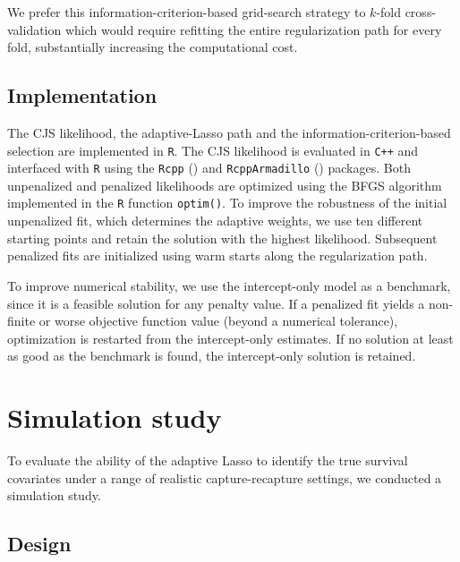 \documentclass[
  11pt,
  a4paper,
]{article}
\begin{document}
We prefer this information-criterion-based grid-search strategy to \(k\)-fold cross-validation which would require refitting the entire regularization path for every fold, substantially increasing the computational cost.

\subsection{Implementation}\label{implementation}

The CJS likelihood, the adaptive-Lasso path and the information-criterion-based selection are implemented in \texttt{R}. The CJS likelihood is evaluated in \texttt{C++} and interfaced with \texttt{R} using the \texttt{Rcpp} () and \texttt{RcppArmadillo} () packages. Both unpenalized and penalized likelihoods are optimized using the BFGS algorithm implemented in the \texttt{R} function \texttt{optim()}. To improve the robustness of the initial unpenalized fit, which determines the adaptive weights, we use ten different starting points and retain the solution with the highest likelihood. Subsequent penalized fits are initialized using warm starts along the regularization path.

To improve numerical stability, we use the intercept-only model as a benchmark, since it is a feasible solution for any penalty value. If a penalized fit yields a non-finite or worse objective function value (beyond a numerical tolerance), optimization is restarted from the intercept-only estimates. If no solution at least as good as the benchmark is found, the intercept-only solution is retained.

\section{Simulation study}\label{simulations}

To evaluate the ability of the adaptive Lasso to identify the true survival covariates under a range of realistic capture-recapture settings, we conducted a simulation study.

\subsection{Design}\label{design}
\end{document}
